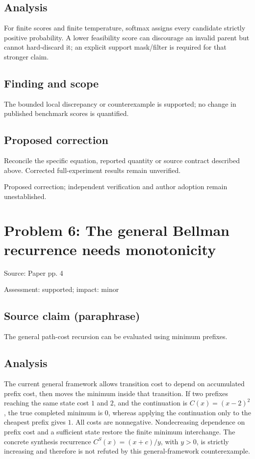 \documentclass[11pt]{article}
\begin{document}
\subsection*{Analysis}

For finite scores and finite temperature, softmax assigns every candidate strictly positive probability. A lower feasibility score can discourage an invalid parent but cannot hard-discard it; an explicit support mask/filter is required for that stronger claim.

\subsection*{Finding and scope}

The bounded local discrepancy or counterexample is supported; no change in published benchmark scores is quantified.

\subsection*{Proposed correction}

Reconcile the specific equation, reported quantity or source contract described above. Corrected full-experiment results remain unverified.

Proposed correction; independent verification and author adoption remain unestablished.

\section*{Problem 6: The general Bellman recurrence needs monotonicity}

Source: Paper pp. 4

Assessment: supported; impact: minor

\subsection*{Source claim (paraphrase)}

The general path-cost recursion can be evaluated using minimum prefixes.

\subsection*{Analysis}

The current general framework allows transition cost to depend on accumulated prefix cost, then moves the minimum inside that transition. If two prefixes reaching the same state cost \(1\) and \(2\), and the continuation is \(C(x)=(x-2)^2\), the true completed minimum is \(0\), whereas applying the continuation only to the cheapest prefix gives \(1\). All costs are nonnegative. Nondecreasing dependence on prefix cost and a sufficient state restore the finite minimum interchange. The concrete synthesis recurrence \(C^S(x)=(x+c)/y\), with \(y>0\), is strictly increasing and therefore is not refuted by this general-framework counterexample.
\end{document}
